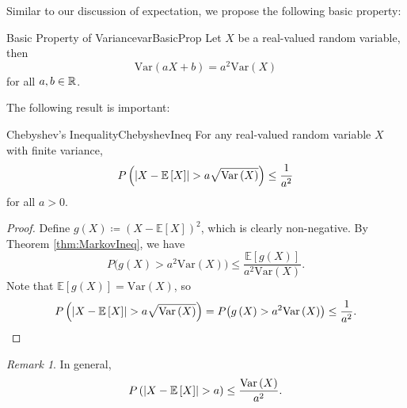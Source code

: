 \documentclass[math, code]{amznotes}
\theoremstyle{remark}
\newtheorem*{remark}{Remark}
\begin{document}
Similar to our discussion of expectation, we propose the following basic property:
\begin{probox}{Basic Property of Variance}{varBasicProp}
    Let $X$ be a real-valued random variable, then 
    \begin{equation*}
        \mathrm{Var}\left(aX + b\right) = a^2\mathrm{Var}\left(X\right)
    \end{equation*}
    for all $a, b \in \mathbb{R}$.
\end{probox}
The following result is important:
\begin{thmbox}{Chebyshev's Inequality}{ChebyshevIneq}
    For any real-valued random variable $X$ with finite variance, 
    \begin{equation*}
        P\left({\left\lvert {X - \mathbb{E}\left[X\right]} \right\rvert} > a\sqrt{\mathrm{Var}\left(X\right)}\right) \leq \frac{1}{a^2}
    \end{equation*}
    for all $a > 0$.
    \tcblower
    \begin{proof}
        Define $g\left(X\right) \coloneqq \left(X - \mathbb{E}\left[X\right]\right)^2$, which is clearly non-negative. By Theorem \ref{thm:MarkovIneq}, we have 
        \begin{equation*}
            P\bigl(g\left(X\right) > a^2\mathrm{Var}\left(X\right)\bigr) \leq \frac{\mathbb{E}\left[g\left(X\right)\right]}{a^2\mathrm{Var}\left(X\right)}.
        \end{equation*}
        Note that $\mathbb{E}\left[g\left(X\right)\right] = \mathrm{Var}\left(X\right)$, so 
        \begin{equation*}
            P\left({\left\lvert {X - \mathbb{E}\left[X\right]} \right\rvert} > a\sqrt{\mathrm{Var}\left(X\right)}\right) = P\bigl(g\left(X\right) > a^2\mathrm{Var}\left(X\right)\bigr) \leq \frac{1}{a^2}.
        \end{equation*}
    \end{proof}
\end{thmbox}
\begin{notebox}
    \begin{remark}
        In general, 
        \begin{equation*}
            P\left({\left\lvert {X - \mathbb{E}\left[X\right]} \right\rvert} > a\right) \leq \frac{\mathrm{Var}\left(X\right)}{a^2}.
        \end{equation*}
    \end{remark}
\end{notebox}
\end{document}
